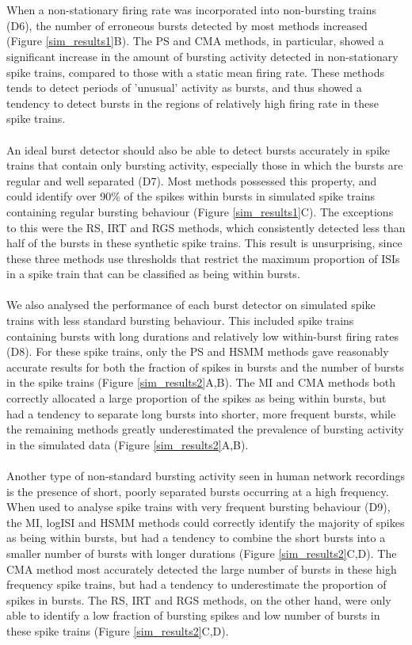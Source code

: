 \documentclass[12pt, titlepage]{article}
\begin{document}
	\\ \\ When a non-stationary firing rate was incorporated into non-bursting trains (D6), the number of erroneous bursts detected by most methods increased (Figure \ref{sim_results1}B). The PS and CMA methods, in particular, showed a significant increase in the amount of bursting activity detected in non-stationary spike trains, compared to those with a static mean firing rate. These methods tends to detect periods of 'unusual' activity as bursts, and thus showed a tendency to detect bursts in the regions of relatively high firing rate in these spike trains. 
	\\ \\ An ideal burst detector should also be able to detect bursts accurately in spike trains that contain only bursting activity, especially those in which the bursts are regular and well separated (D7). Most methods possessed this property, and could identify over 90\% of the spikes within bursts in simulated spike trains containing regular bursting behaviour (Figure \ref{sim_results1}C). The exceptions to this were the RS, IRT and RGS methods, which consistently detected less than half of the bursts in these synthetic spike trains. This result is unsurprising, since these three methods use thresholds that restrict the maximum proportion of ISIs in a spike train that can be classified as being within bursts.
	\\ \\ We also analysed the performance of each burst detector on simulated spike trains with less standard bursting behaviour. This included  spike trains containing bursts with long durations and relatively low within-burst firing rates (D8). For these spike trains, only the PS and HSMM methods gave reasonably accurate results for both the fraction of spikes in bursts and the number of bursts in the spike trains (Figure \ref{sim_results2}A,B). The MI and CMA methods both correctly allocated a large proportion of the spikes as being within bursts, but had a tendency to separate long bursts into shorter, more frequent bursts, while the remaining methods greatly underestimated the prevalence of bursting activity in the simulated data (Figure \ref{sim_results2}A,B).
	\\ \\ Another type of non-standard bursting activity seen in human network recordings is the presence of short, poorly separated bursts occurring at a high frequency. When used to analyse spike trains with very frequent bursting behaviour (D9), the MI, logISI and HSMM methods could correctly identify the majority of spikes as being within bursts, but had a tendency to combine the short bursts into a smaller number of bursts with longer durations (Figure \ref{sim_results2}C,D). The CMA method most accurately detected the large number of bursts in these high frequency spike trains, but had a tendency to underestimate the proportion of spikes in bursts. The RS, IRT and RGS methods, on the other hand, were only able to identify a low fraction of bursting spikes and low number of bursts in these spike trains (Figure \ref{sim_results2}C,D).
\end{document}
